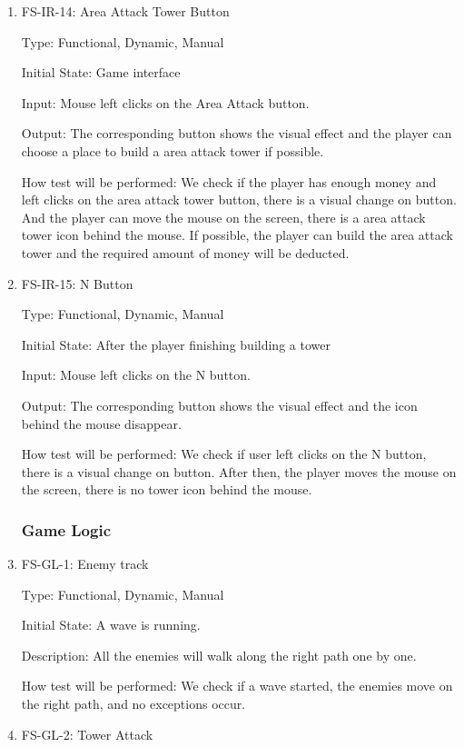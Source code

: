 \documentclass[12pt]{article}
\begin{document}
\begin{enumerate}
	\item{FS-IR-14: Area Attack Tower Button}
					
	Type: Functional, Dynamic, Manual
					
	Initial State: Game interface
					
	Input: Mouse left clicks on the Area Attack button.
					
	Output: The corresponding button shows the visual effect and the player can choose a place to build a area attack tower if possible.
					
	How test will be performed: We check if the player has enough money and left clicks on the area attack tower button, there is a visual change on button. And the player can move the mouse on the screen, there is a area attack tower icon behind the mouse. If possible, the player can build the area attack tower and the required amount of money will be deducted.
	
	\item{FS-IR-15: N Button}
					
	Type: Functional, Dynamic, Manual
					
	Initial State: After the player finishing building a tower
					
	Input: Mouse left clicks on the N button.
					
	Output: The corresponding button shows the visual effect and the icon behind the mouse disappear.
					
	How test will be performed: We check if user left clicks on the N button, there is a visual change on button. After then, the player moves the mouse on the screen, there is no tower icon behind the mouse. 	
	
	\subsubsection{Game Logic}				
	
	\item{FS-GL-1: Enemy track}

	Type: Functional, Dynamic, Manual

	Initial State: A wave is running.
	
    Description: All the enemies will walk along the right path one by one.
	
	How test will be performed: We check if a wave started, the enemies move on the right path, and no exceptions occur.
	
	\item{FS-GL-2: Tower Attack}
					

\end{enumerate}
\end{document}
